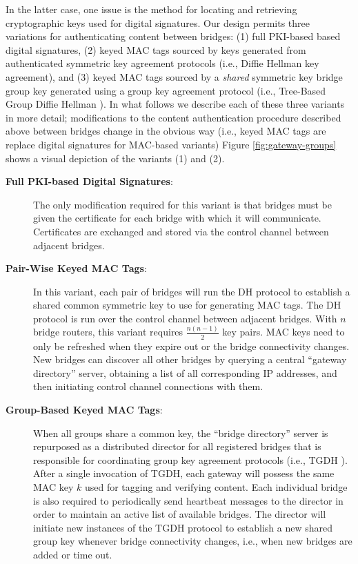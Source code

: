In the latter case, one issue is the method for locating and retrieving cryptographic keys used for digital signatures. Our design permits three variations for authenticating content between bridges: (1) full PKI-based based digital signatures, (2) keyed MAC tags sourced by keys generated from authenticated symmetric key agreement protocols (i.e., Diffie Hellman key agreement), and (3) keyed MAC tags sourced by a \emph{shared} symmetric key bridge group key generated using a group key agreement protocol (i.e., Tree-Based Group Diffie Hellman \cite{kim2004tree}). In what follows we describe each of these three variants in more detail; modifications to the content authentication procedure described above between bridges change in the obvious way (i.e., keyed MAC tags are replace digital signatures for MAC-based variants) Figure \ref{fig:gateway-groups} shows a visual depiction of the variants (1) and (2). \\

\begin{description}

	\item[\textbf{Full PKI-based Digital Signatures}:] The only modification required for this variant is that bridges must be given the certificate for each bridge with which it will communicate. Certificates are exchanged and stored via the control channel between adjacent bridges.

	\item[\textbf{Pair-Wise Keyed MAC Tags}:] In this variant, each pair of bridges will run the DH protocol to establish a shared common symmetric key to use for generating MAC tags. The DH protocol is run over the control channel between adjacent bridges. With $n$ bridge routers, this variant requires $\frac{n(n-1)}{2}$ key pairs. MAC keys need to only be refreshed when they expire out or the bridge connectivity changes. New bridges can discover all other bridges by querying a central ``gateway directory'' server, obtaining a list of all corresponding IP addresses, and then initiating control channel connections with them.

	\item[\textbf{Group-Based Keyed MAC Tags}:] When all groups share a common key, the ``bridge directory'' server is repurposed as a distributed director for all registered bridges that is responsible for coordinating group key agreement protocols (i.e., TGDH \cite{kim2004tree}). After a single invocation of TGDH, each gateway will possess the same MAC key $k$ used for tagging and verifying content. Each individual bridge is also required to periodically send heartbeat messages to the director in order to maintain an active list of available bridges. The director will initiate new instances of the TGDH protocol to establish a new shared group key whenever bridge connectivity changes, i.e., when new bridges are added or time out. 

\end{description}

